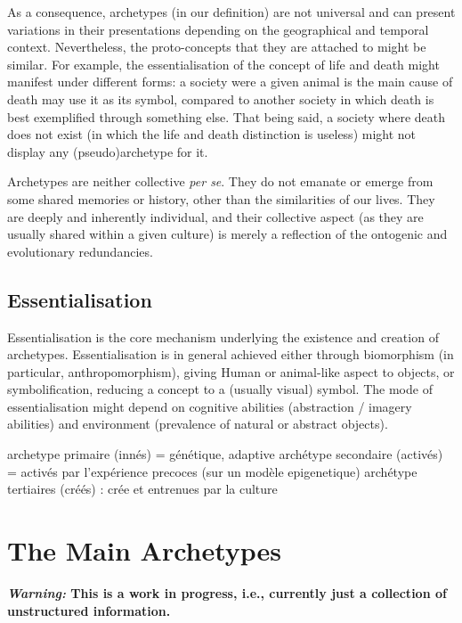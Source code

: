 \documentclass[
]{book}
\begin{document}
As a consequence, archetypes (in our definition) are not universal and can present variations in their presentations depending on the geographical and temporal context. Nevertheless, the proto-concepts that they are attached to might be similar. For example, the essentialisation of the concept of life and death might manifest under different forms: a society were a given animal is the main cause of death may use it as its symbol, compared to another society in which death is best exemplified through something else. That being said, a society where death does not exist (in which the life and death distinction is useless) might not display any (pseudo)archetype for it.

Archetypes are neither collective \emph{per se}. They do not emanate or emerge from some shared memories or history, other than the similarities of our lives. They are deeply and inherently individual, and their collective aspect (as they are usually shared within a given culture) is merely a reflection of the ontogenic and evolutionary redundancies.

\hypertarget{essentialisation}{%
\section{Essentialisation}\label{essentialisation}}

Essentialisation is the core mechanism underlying the existence and creation of archetypes. Essentialisation is in general achieved either through biomorphism (in particular, anthropomorphism), giving Human or animal-like aspect to objects, or symbolification, reducing a concept to a (usually visual) symbol. The mode of essentialisation might depend on cognitive abilities (abstraction / imagery abilities) and environment (prevalence of natural or abstract objects).

archetype primaire (innés) = génétique, adaptive
archétype secondaire (activés) = activés par l'expérience precoces (sur un modèle epigenetique)
archétype tertiaires (créés) : crée et entrenues par la culture

\hypertarget{the-main-archetypes}{%
\chapter{The Main Archetypes}\label{the-main-archetypes}}

\textbf{\emph{Warning:} This is a work in progress, i.e., currently just a collection of unstructured information.}
\end{document}
